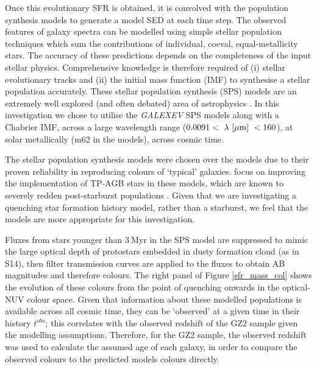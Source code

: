 \documentclass[useAMS,usenatbib]{mn2e}
\def\changed    {\color{titlecol} }
\begin{document}
Once this evolutionary SFR is obtained, it is convolved with the \citet{BC03} population synthesis models to generate a model SED at each time step. The observed features of galaxy spectra can be modelled using simple stellar population techniques which sum the contributions of individual, coeval, equal-metallicity stars. The accuracy of these predictions depends on the completeness of the input stellar physics. Comprehensive knowledge is therefore required of (i) stellar evolutionary tracks and (ii) the initial mass function (IMF) to synthesise a stellar population accurately. These stellar population synthesis (SPS) models are an extremely well explored (and often debated) area of astrophysics \citep{Maraston05, Eminian08, CGW09, Falk09, Chen10, Kriek10, MRC11, Mel12}. In this investigation we chose to utilise the \citet{BC03} \emph{GALEXEV} SPS models along with a Chabrier \citep{Chab03} IMF, across a large wavelength range ($0.0091 < ~\lambda~\rm{[\mu m]}~ < 160 $), at solar metallically (m62 in the \citet{BC03} models), across cosmic time.

The \citet{BC03} stellar population synthesis models were chosen over the \citet{Maraston05} models due to their proven reliability in reproducing colours of `typical' galaxies. \citet{Maraston05} focus on improving the implementation of TP-AGB stars in these models, which are known to severely redden post-starburst populations \citep{MG07, Kriek10}. Given that we are investigating a quenching star formation history model, rather than a starburst, we feel that the \citet{BC03} models are more appropriate for this investigation. 

Fluxes from stars younger than $3~$Myr in the SPS model are suppressed to mimic the large optical depth of protostars embedded in dusty formation cloud (as in S14), then filter transmission curves are applied to the fluxes to obtain AB magnitudes and therefore colours. The right panel of Figure \ref{sfr_mass_col} shows the evolution of these colours from the point of quenching onwards in the optical-NUV colour space. {\changed Given that information about these modelled populations is available across all cosmic time, they can be `observed' at a given time in their history $t^{obs}$; this correlates with the observed redshift of the GZ2 sample given the modelling assumptions.} Therefore, for the GZ2 sample, the observed redshift was used to calculate the assumed age of each galaxy, in order to compare the observed colours to the predicted models colours directly. 
\end{document}
